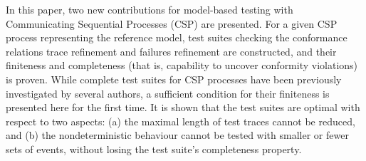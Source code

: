 In this paper, two new contributions for model-based testing with
Communicating Sequential Processes (CSP) are presented. For a given CSP
process representing the reference model, test suites checking the
conformance relations trace refinement and failures refinement are constructed, and
their finiteness and completeness (that is, capability to uncover conformity
violations) is proven. While complete test suites for CSP processes have been
previously investigated by several authors, a sufficient condition for their
finiteness is presented here for the first time. 
It is shown that the test suites are optimal with respect to two aspects:  (a)  the maximal length of test traces cannot be reduced, and (b) the nondeterministic behaviour cannot be tested with smaller or fewer sets of events, without losing the test suite's completeness property. 
